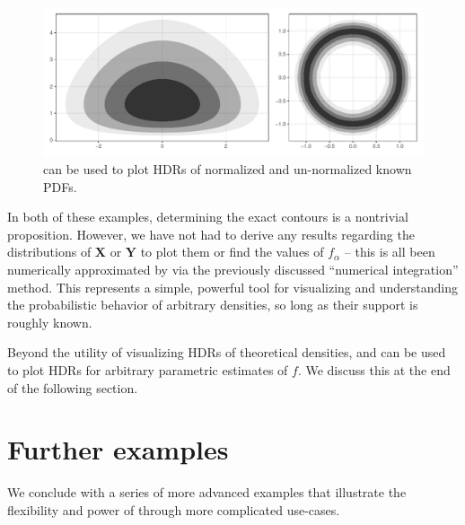 \begin{knitrout}
\color{fgcolor}\begin{figure}[h!]

{\centering \includegraphics[width=\maxwidth]{figures/eval-hdr-2d-known-1}

}

\caption{ can be used to plot HDRs of normalized and un-normalized known PDFs.}\label{fig:eval-hdr-2d-known}
\end{figure}

\end{knitrout}

In both of these examples, determining the exact contours is a nontrivial proposition.
However, we have not had to derive any results regarding the distributions of $\mathbf{X}$ or $\mathbf{Y}$ to plot them or find the values of $f_{\alpha}$ -- this is all been numerically approximated by  via the previously discussed ``numerical integration'' method.
This represents a simple, powerful tool for visualizing and understanding the probabilistic behavior of arbitrary densities, so long as their support is roughly known.

Beyond the utility of visualizing HDRs of theoretical densities,  and  can be used to plot HDRs for arbitrary parametric estimates of $f$.
We discuss this at the end of the following section.


\pagebreak

\section{Further examples}\label{sec:further-examples}

We conclude with a series of more advanced examples that illustrate the flexibility and power of  through more complicated use-cases.


